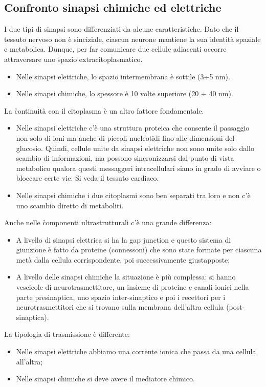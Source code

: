 \subsection{Confronto sinapsi chimiche ed elettriche}
I due tipi di sinapsi sono differenziati da alcune caratteristiche. Dato che il tessuto nervoso non è sinciziale, ciascun neurone mantiene la sua identità spaziale e metabolica. Dunque, per far comunicare due cellule adiacenti occorre attraversare uno \h{spazio extracitoplasmatico}.
\begin{itemize}
    \item Nelle sinapsi elettriche, lo spazio intermembrana è sottile (3$\div$5 nm).
    \item Nelle sinapsi chimiche, lo spessore è 10 volte superiore (20 $\div$ 40 nm).
\end{itemize}
La \h{continuità con il citoplasma} è un altro fattore fondamentale.
\begin{itemize}
    \item Nelle sinapsi elettriche c’è una struttura proteica che consente il passaggio non solo di ioni ma anche di piccoli nucleotidi fino alle dimensioni del glucosio. Quindi, cellule unite da sinapsi elettriche non sono unite solo dallo scambio di informazioni, ma possono sincronizzarsi dal punto di vista metabolico qualora questi messaggeri intracellulari siano in grado di avviare o bloccare certe vie. Si veda il tessuto cardiaco.
    \item Nelle sinapsi chimiche i due citoplasmi sono ben separati tra loro e non c’è uno scambio diretto di metaboliti.
\end{itemize}
Anche nelle \h{componenti ultrastrutturali} c’è una grande differenza:
\begin{itemize}
    \item A livello di sinapsi elettrica si ha la gap junction e questo sistema di giunzione è fatto da proteine (connessoni) che sono state formate per ciascuna metà dalla cellula corrispondente, poi successivamente giustapposte;
    \item A livello delle sinapsi chimiche la situazione è più complessa: si hanno vescicole di neurotrasmettitore, un insieme di proteine e canali ionici nella parte presinaptica, uno spazio inter-sinaptico e poi i recettori per i neurotrasmettitori che si trovano sulla membrana dell’altra cellula (post-sinaptica).
\end{itemize}
La \h{tipologia di trasmissione} è differente:
\begin{itemize}
    \item Nelle sinapsi elettriche abbiamo una corrente ionica che passa da una cellula all’altra;
    \item Nelle sinapsi chimiche si deve avere il mediatore chimico.
\end{itemize}

